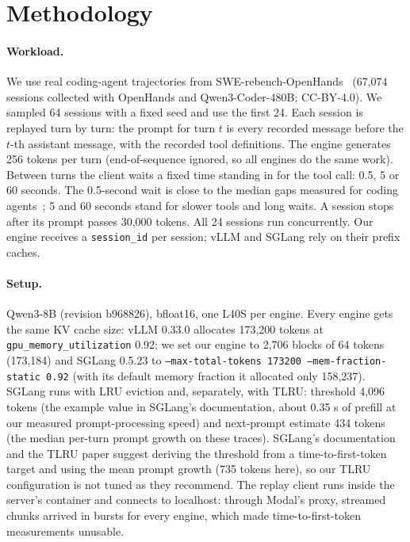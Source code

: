 \documentclass[11pt]{article}
\begin{document}
\section{Methodology}
\label{sec:method}

\paragraph{Workload.} We use real coding-agent trajectories from SWE-rebench-OpenHands~\cite{dataset} (67,074 sessions collected with OpenHands and Qwen3-Coder-480B; CC-BY-4.0). We sampled 64 sessions with a fixed seed and use the first 24. Each session is replayed turn by turn: the prompt for turn $t$ is every recorded message before the $t$-th assistant message, with the recorded tool definitions. The engine generates 256 tokens per turn (end-of-sequence ignored, so all engines do the same work). Between turns the client waits a fixed time standing in for the tool call: 0.5, 5 or 60 seconds. The 0.5-second wait is close to the median gaps measured for coding agents~\cite{cachetrap}; 5 and 60 seconds stand for slower tools and long waits. A session stops after its prompt passes 30,000 tokens. All 24 sessions run concurrently. Our engine receives a \texttt{session\_id} per session; vLLM and SGLang rely on their prefix caches.

\paragraph{Setup.} Qwen3-8B (revision b968826), bfloat16, one L40S per engine. Every engine gets the same KV cache size: vLLM 0.33.0 allocates 173,200 tokens at \texttt{gpu\_memory\_utilization} 0.92; we set our engine to 2,706 blocks of 64 tokens (173,184) and SGLang 0.5.23 to \texttt{--max-total-tokens 173200 --mem-fraction-static 0.92} (with its default memory fraction it allocated only 158,237). SGLang runs with LRU eviction and, separately, with TLRU: threshold 4,096 tokens (the example value in SGLang's documentation, about 0.35 s of prefill at our measured prompt-processing speed) and next-prompt estimate 434 tokens (the median per-turn prompt growth on these traces). SGLang's documentation and the TLRU paper suggest deriving the threshold from a time-to-first-token target and using the mean prompt growth (735 tokens here), so our TLRU configuration is not tuned as they recommend. The replay client runs inside the server's container and connects to localhost: through Modal's proxy, streamed chunks arrived in bursts for every engine, which made time-to-first-token measurements unusable.
\end{document}
